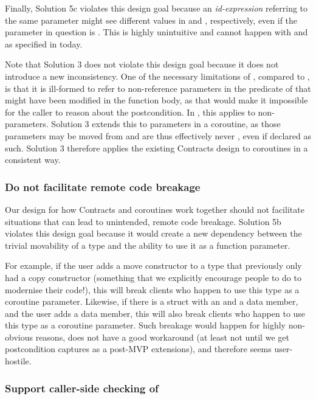 Finally, Solution 5c violates this design goal because an \emph{id-expression} referring to the same parameter might see different values in  and , respectively, even if the parameter in question is . This is highly unintuitive and cannot happen with  and  as specified in \cite{P2900R8} today.

Note that Solution 3 does not violate this design goal because it does not introduce a new inconsistency. One of the necessary limitations of , compared to , is that it is ill-formed to refer to non-reference parameters in the predicate of  that might have been modified in the function body, as that would make it impossible for the caller to reason about the postcondition. In \cite{P2900R8}, this applies to non- parameters. Solution 3 extends this to  parameters in a coroutine, as those parameters may be moved from and are thus effectively never , even if declared as such. Solution 3 therefore applies the existing Contracts design to coroutines in a consistent way.

\subsubsection{Do not facilitate remote code breakage}

Our design for how Contracts and coroutines work together should not facilitate situations that can lead to unintended, remote code breakage. Solution 5b violates this design goal because it would create a new dependency between the trivial movability of a type and the ability to use it as a function parameter.

For example, if the user adds a move constructor to a type that previously only had a copy constructor (something that we explicitly encourage people to do to modernise their code!), this will break clients who happen to use this type as a coroutine parameter. Likewise, if there is a struct with an  and a  data member, and the user adds a  data member, this will also break clients who happen to use this type as a coroutine parameter. Such breakage would happen for highly non-obvious reasons, does not have a good workaround (at least not until we get postcondition captures as a post-MVP extensions), and therefore seems user-hostile.

\subsubsection{Support caller-side checking of }

